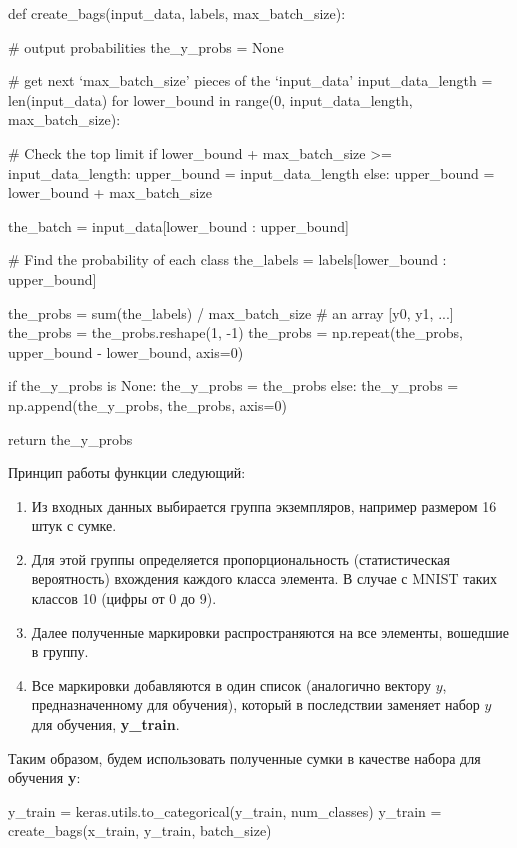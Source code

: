 \documentclass[12pt,a4paper]{article}
\begin{document}
\begin{codeframe}
def create_bags(input_data, labels, max_batch_size):

    # output probabilities
    the_y_probs = None

    # get next `max_batch_size' pieces of the `input_data'
    input_data_length = len(input_data)
    for lower_bound in range(0, input_data_length, max_batch_size):

        # Check the top limit
        if lower_bound + max_batch_size >= input_data_length:
            upper_bound = input_data_length
        else:
            upper_bound = lower_bound + max_batch_size

        the_batch = input_data[lower_bound : upper_bound]

        # Find the probability of each class
        the_labels = labels[lower_bound : upper_bound]

        the_probs = sum(the_labels) / max_batch_size # an array [y0, y1, ...]
        the_probs = the_probs.reshape(1, -1)
        the_probs = np.repeat(the_probs, upper_bound - lower_bound, axis=0)

        if the_y_probs is None:
            the_y_probs = the_probs
        else:
            the_y_probs = np.append(the_y_probs, the_probs, axis=0)

    return the_y_probs
\end{codeframe}

Принцип работы функции следующий:
\begin{enumerate}
\item Из входных данных выбирается группа экземпляров, например
  размером 16 штук с сумке.
\item Для этой группы определяется пропорциональность (статистическая
  вероятность) вхождения каждого класса элемента. В случае с MNIST
  таких классов 10 (цифры от 0 до 9).
\item Далее полученные маркировки распространяются на все элементы,
  вошедшие в группу.
\item Все маркировки добавляются в один список (аналогично вектору
  \( y \), предназначенному для обучения), который в последствии
  заменяет набор \( y \) для обучения, \textbf{y\_train}.
\end{enumerate}

Таким образом, будем использовать полученные сумки в качестве набора для обучения \textbf{y}:
\begin{codeframe}
y_train = keras.utils.to_categorical(y_train, num_classes)
y_train = create_bags(x_train, y_train, batch_size)
\end{codeframe}
\end{document}
